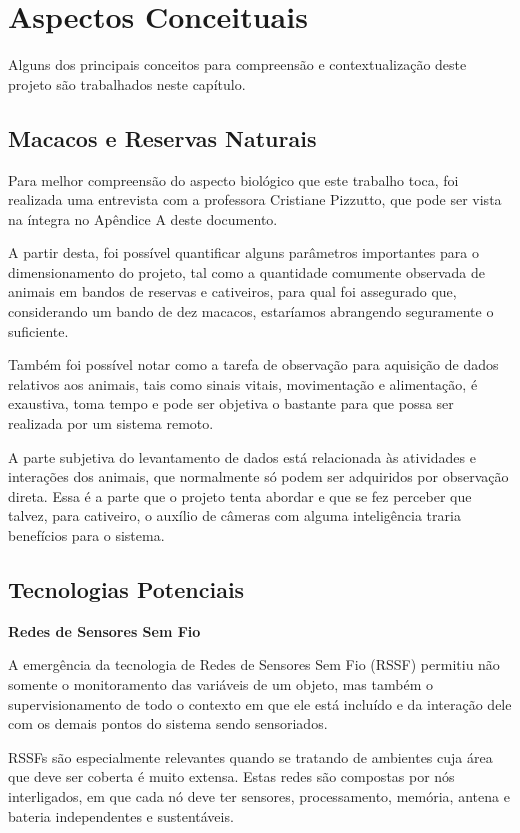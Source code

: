 \chapter{Aspectos Conceituais}
Alguns dos principais conceitos para compreensão e contextualização deste projeto são trabalhados neste capítulo.

\section{Macacos e Reservas Naturais}
Para melhor compreensão do aspecto biológico que este trabalho toca, foi realizada uma entrevista com a professora Cristiane Pizzutto, que pode ser vista na íntegra no Apêndice A deste documento.

A partir desta, foi possível quantificar alguns parâmetros importantes para o dimensionamento do projeto, tal como a quantidade comumente observada de animais em bandos de reservas e cativeiros, para qual foi assegurado que, considerando um bando de dez macacos, estaríamos abrangendo seguramente o suficiente.

Também foi possível notar como a tarefa de observação para aquisição de dados relativos aos animais, tais como sinais vitais, movimentação e alimentação, é exaustiva, toma tempo e pode ser objetiva o bastante para que possa ser realizada por um sistema remoto.

A parte subjetiva do levantamento de dados está relacionada às atividades e interações dos animais, que normalmente só podem ser adquiridos por observação direta. Essa é a parte que o projeto tenta abordar e que se fez perceber que talvez, para cativeiro, o auxílio de câmeras com alguma inteligência traria benefícios para o sistema.

\section{Tecnologias Potenciais}
\textbf{Redes de Sensores Sem Fio}

A emergência da tecnologia de Redes de Sensores Sem Fio (RSSF) permitiu não somente o monitoramento das variáveis de um objeto, mas também o supervisionamento de todo o contexto em que ele está incluído e da interação dele com os demais pontos do sistema sendo sensoriados.

RSSFs são especialmente relevantes quando se tratando de ambientes cuja área que deve ser coberta é muito extensa. Estas redes são compostas por nós interligados, em que cada nó deve ter sensores, processamento, memória, antena e bateria independentes e sustentáveis.

